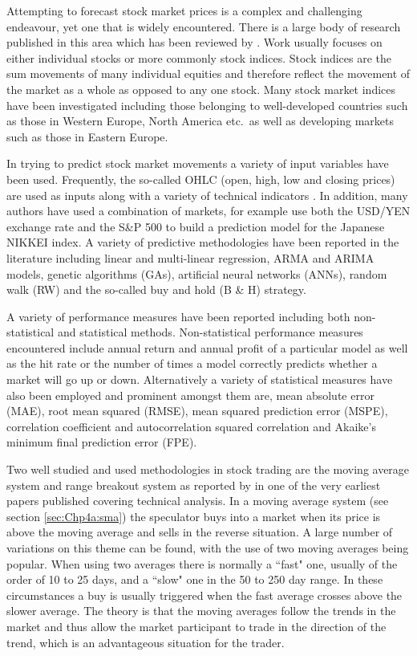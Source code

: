 Attempting to forecast stock market prices is a complex and challenging endeavour, yet one that is widely encountered. There is a large body of research published in this area which has been reviewed by \cite{Atsalakis20095932}. Work usually focuses on either individual stocks or more commonly stock indices. Stock indices are the sum movements of many individual equities and therefore reflect the movement of the market as a whole as opposed to any one stock. Many stock market indices have been investigated including those belonging to well-developed countries such as those in Western Europe, North America etc.\ as well as developing markets such as those in Eastern Europe.

In trying to predict stock market movements a variety of input variables have been used. Frequently, the so-called OHLC (open, high, low and closing prices) are used as inputs along with a variety of technical indicators \citep{Fiess2002353}. In addition, many authors have used a combination of markets, for example \cite{Huang20052513} use both the USD/YEN exchange rate and the S\&P 500 to build a prediction model for the Japanese NIKKEI index. A variety of predictive methodologies have been reported in the literature including linear and multi-linear regression, ARMA and ARIMA models, genetic algorithms (GAs), artificial neural networks (ANNs), random walk (RW) and the so-called buy and hold (B \& H) strategy.

A variety of performance measures have been reported including both non-statistical and statistical methods. Non-statistical performance measures encountered include annual return and annual profit of a particular model as well as the hit rate or the number of times a model correctly predicts whether a market will go up or down. Alternatively a variety of statistical measures have also been employed and prominent amongst them are, mean absolute error (MAE), root mean squared (RMSE), mean squared prediction error (MSPE), correlation coefficient and autocorrelation squared correlation and Akaike’s minimum final prediction error (FPE).

Two well studied and used methodologies in stock trading are the moving average system and range breakout system as reported by \citep{Brock} in one of the very earliest papers published covering technical analysis. In a moving average system (see section \ref{sec:Chp4a:sma}) the speculator buys into a market when its price is above the moving average and sells in the reverse situation. A large number of variations on this theme can be found, with the use of two moving averages being popular. When using two averages there is normally a \textquotedblleft fast" one, usually of the order of 10 to 25 days,  and a \textquotedblleft slow" one in the 50 to 250 day range. In these circumstances a buy is usually triggered when the fast average crosses above the slower average. The theory is that the moving averages follow the trends in the market and thus allow the market participant to trade in the direction of the trend, which is an advantageous situation for the trader.

